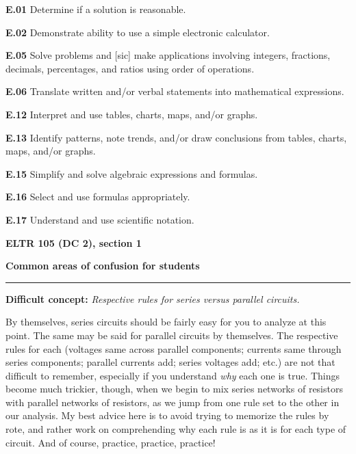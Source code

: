 \item{\bf E.01} Determine if a solution is reasonable.
\item{\bf E.02} Demonstrate ability to use a simple electronic calculator.
\item{\bf E.05} Solve problems and [sic] make applications involving integers, fractions, decimals, percentages, and ratios using order of operations.
\item{\bf E.06} Translate written and/or verbal statements into mathematical expressions.
\item{\bf E.12} Interpret and use tables, charts, maps, and/or graphs.
\item{\bf E.13} Identify patterns, note trends, and/or draw conclusions from tables, charts, maps, and/or graphs.
\item{\bf E.15} Simplify and solve algebraic expressions and formulas.
\item{\bf E.16} Select and use formulas appropriately.
\item{\bf E.17} Understand and use scientific notation.
\medskip





\vfil \eject

\centerline{\bf ELTR 105 (DC 2), section 1} \bigskip 
 
\vskip 10pt

\noindent
{\bf Common areas of confusion for students}

\vskip 5pt

\hrule \vskip 5pt

\vskip 10pt

\noindent
{\bf Difficult concept: } {\it Respective rules for series versus parallel circuits.}

By themselves, series circuits should be fairly easy for you to analyze at this point.  The same may be said for parallel circuits by themselves.  The respective rules for each (voltages same across parallel components; currents same through series components; parallel currents add; series voltages add; etc.) are not that difficult to remember, especially if you understand {\it why} each one is true.  Things become much trickier, though, when we begin to mix series networks of resistors with parallel networks of resistors, as we jump from one rule set to the other in our analysis.  My best advice here is to avoid trying to memorize the rules by rote, and rather work on comprehending why each rule is as it is for each type of circuit.  And of course, practice, practice, practice!

